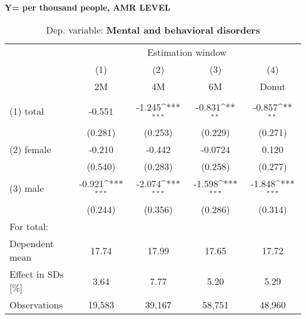 \documentclass{scrartcl} %
\begin{document}
\textbf{Y= per thousand people, AMR LEVEL}
 \begin{table}[htbp] \centering 
 \begin{threeparttable} \centering 
 \caption{Dep. variable: \textbf{Mental and behavioral disorders}} 
 {\def\sym#1{\ifmmode^{#1}\else\(^{#1}\)\fi} 
 \begin{tabular}{l*{4}{c}} \toprule & \multicolumn{4}{c}{Estimation window} \\ \cmidrule(lr){2-5}
	&\multicolumn{1}{c}{(1)}&\multicolumn{1}{c}{(2)}&\multicolumn{1}{c}{(3)}&\multicolumn{1}{c}{(4)}\\
    &\multicolumn{1}{c}{2M}&\multicolumn{1}{c}{4M}&\multicolumn{1}{c}{6M}&\multicolumn{1}{c}{Donut}\\
	\midrule
\\
(1) {total} &   -0.551        &     -1.245\sym{***}    &      -0.831\sym{**}   &   -0.857\sym{**} \\
                        &  (0.281)        &    (0.253)       &     (0.229)     &  (0.271)   \\ 
(2) {female} &   -0.210        &     -0.442       &     -0.0724     &    0.120   \\
                        &  (0.540)        &    (0.283)       &     (0.258)     &  (0.277)   \\ 
(3) {male} &   -0.921\sym{***}     &     -2.074\sym{***}    &      -1.598\sym{***}  &   -1.848\sym{***}\\
                        &  (0.244)        &    (0.356)       &     (0.286)     &  (0.314)   \\
\midrule
For total: \\
Dependent mean &	17.74        &      17.99       &       17.65     &    17.72   \\
Effect in SDs [\%] & 3.64        &      7.77       &       5.20     &    5.29 \\ 
Observations & 19,583        &      39,167       &       58,751     &    48,960   \\
\bottomrule
\end{tabular}}
\end{threeparttable} \end{table} 
\end{document}
